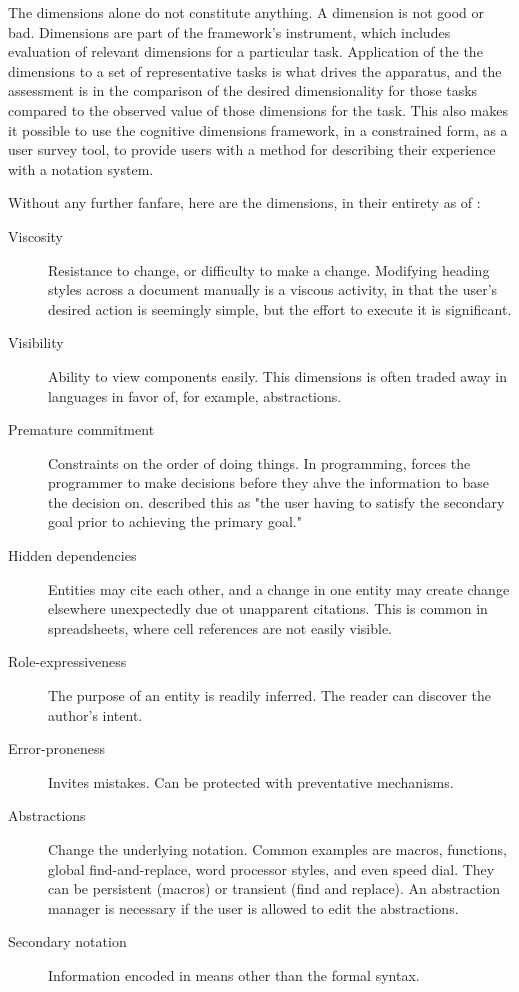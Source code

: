 The dimensions alone do not constitute anything. A dimension is not good or bad. Dimensions are part of the framework's instrument, which includes evaluation of relevant dimensions for a particular task. Application of the the dimensions to a set of representative tasks is what drives the apparatus, and the assessment is in the comparison of the desired dimensionality for those tasks compared to the observed value of those dimensions for the task. This also makes it possible to use the cognitive dimensions framework, in a constrained form, as a user survey tool, to provide users with a method for describing their experience with a notation system.

Without any further fanfare, here are the dimensions, in their entirety as of \citeyear{blackwell-2003}:
\begin{description}
\item [Viscosity] Resistance to change, or difficulty to make a change. Modifying heading styles across a document manually is a viscous activity, in that the user's desired action is seemingly simple, but the effort to execute it is significant.
\item [Visibility] Ability to view components easily. This dimensions is often traded away in languages in favor of, for example, abstractions.
\item [Premature commitment] Constraints on the order of doing things. In programming, forces the programmer to make decisions before they ahve the information to base the decision on. \citet{roast-2000} described this as "the user having to satisfy the secondary goal prior to achieving the primary goal."
\item [Hidden dependencies] Entities may cite each other, and a change in one entity may create change elsewhere unexpectedly due ot unapparent citations. This is common in spreadsheets, where cell references are not easily visible.
\item [Role-expressiveness] The purpose of an entity is readily inferred. The reader can discover the author's intent. 
\item [Error-proneness] Invites mistakes. Can be protected with preventative mechanisms.  
\item [Abstractions] Change the underlying notation. Common examples are macros, functions, global find-and-replace, word processor styles, and even speed dial. They can be persistent (macros) or transient (find and replace). An abstraction manager is necessary if the user is allowed to edit the abstractions. 
\item [Secondary notation] Information encoded in means other than the formal syntax. 

\end{description}
